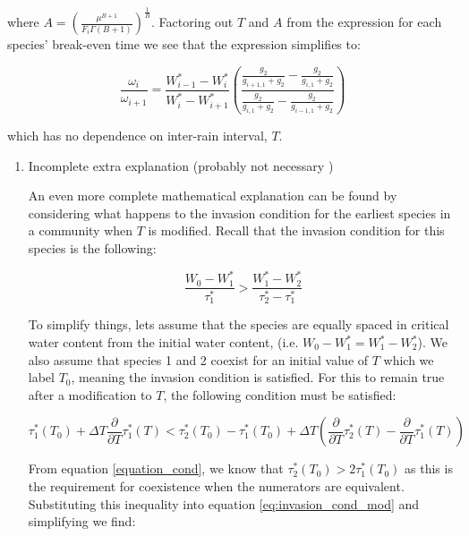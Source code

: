 \documentclass[11pt]{article}
\begin{document}
where \(A = \left(\frac{\mu^{B+1}}{F_i \Gamma(B+1)}\right)^{\frac{1}{B}}\). Factoring out \(T\) and \(A\) from the expression for each species' break-even time we see that the expression simplifies to:

\begin{equation}
    \frac{\omega_i}{\omega_{i+1}} = \frac{W_{i-1}^* - W_i^*}{W_{i}^* - W_{i+1}^*} \left( \frac{\frac{g_2}{g_{i+1,1} + g_2} - \frac{g_2}{g_{i,1} + g_2}}{ \frac{g_2}{g_{i,1} + g_2}  -  \frac{g_2}{g_{i-1,1} + g_2} } \right)
\end{equation}

which has no dependence on inter-rain interval, \(T\).

\begin{enumerate}
\item Incomplete extra explanation (probably not necessary )
\label{sec:orgc47d202}

An even more complete mathematical explanation can be found by considering what happens to the invasion condition for the earliest species in a community when \(T\) is modified. Recall that the invasion condition for this species is the following:

\begin{equation} \label{eq:invasion_cond}
    \frac{W_0 - W_1^*}{\tau_1^*} > \frac{W_1^* - W_2^*}{\tau_2^* - \tau_1^*}
\end{equation}

To simplify things, lets assume that the species are equally spaced in critical water content from the initial water content, (i.e. \(W_0 - W_1^* = W_1^* - W_2^*\)). We also assume that species 1 and 2 coexist for an initial value of \(T\) which we label \(T_0\), meaning the invasion condition is satisfied. For this to remain true after a modification to \(T\), the following condition must be satisfied:

\begin{equation} \label{eq:invasion_cond_mod}
    \tau_1^*(T_0) + \Delta T \frac{\partial}{\partial T} \tau_1^* (T) < \tau_2^*(T_0) - \tau_1^*(T_0) + \Delta T \left( \frac{\partial}{\partial T} \tau_2^* (T) - \frac{\partial}{\partial T} \tau_1^* (T) \right)
\end{equation}

From equation \ref{equation_cond}, we know that \(\tau_2^* (T_0) > 2 \tau_1^* (T_0)\) as this is the requirement for coexistence when the numerators are equivalent. Substituting this inequality into equation \ref{eq:invasion_cond_mod} and simplifying we find:


\end{enumerate}
\end{document}
